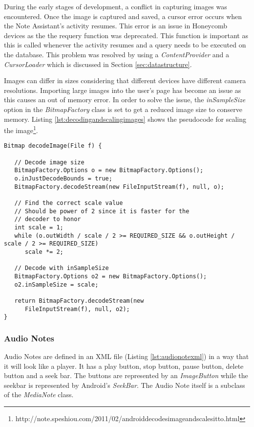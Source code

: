 During the early stages of development, a conflict in capturing images was encountered. Once the image is captured and saved, a cursor error occurs when the Note Assistant's activity resumes. This error is an issue in Honeycomb devices as the the requery function was deprecated. This function is important as this is called whenever the activity resumes and a query needs to be executed on the database. This problem was resolved by using a \textit{ContentProvider} and a \textit{CursorLoader} which is discussed in Section \ref{sec:datastructure}. 

Images can differ in sizes considering that different devices have different camera resolutions. Importing large images into the user's page has become an issue as this causes an out of memory error. In order to solve the issue, the \textit{inSampleSize} option in the \textit{BitmapFactory} class is set to get a reduced image size to conserve memory. Listing \ref{lst:decodingandscalingimages} shows the pseudocode for scaling the image\footnote[6]{http://note.speshiou.com/2011/02/android\-decodes\-image\-and\-scales\-it\-to.html}.

\begin{lstlisting}[frame=single, label=lst:decodingandscalingimages, caption=Algorithm for decoding and scaling images to reduce memory consumption]
Bitmap decodeImage(File f) {

   // Decode image size
   BitmapFactory.Options o = new BitmapFactory.Options();
   o.inJustDecodeBounds = true;
   BitmapFactory.decodeStream(new FileInputStream(f), null, o);

   // Find the correct scale value
   // Should be power of 2 since it is faster for the
   // decoder to honor
   int scale = 1;
   while (o.outWidth / scale / 2 >= REQUIRED_SIZE && o.outHeight / scale / 2 >= REQUIRED_SIZE)
	  scale *= 2;

   // Decode with inSampleSize
   BitmapFactory.Options o2 = new BitmapFactory.Options();
   o2.inSampleSize = scale;
	
   return BitmapFactory.decodeStream(new
      FileInputStream(f), null, o2);
}
\end{lstlisting}

\subsubsection{Audio Notes}
\label{sec:audionotes}

Audio Notes are defined in an XML file (Listing \ref{lst:audionotexml}) in a way that it will look like a player. It has a play button, stop button, pause button, delete button and a seek bar. The buttons are represented by an \textit{ImageButton} while the seekbar is represented by Android's \textit{SeekBar}. The Audio Note itself is a subclass of the \textit{MediaNote} class. 

